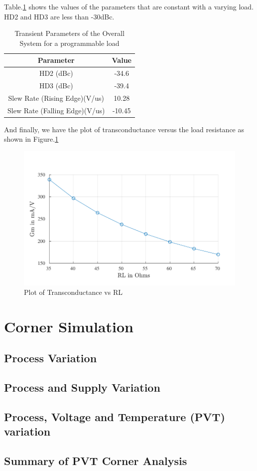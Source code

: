 Table.\ref{tab:RL_trans_2} shows the values of the parameters that are constant with a varying load. HD2 and HD3 are less than -30dBc.
\begin{table} [H]
\centering
\begin{tabular}{@{}cc@{}}
\toprule
Parameter							& Value		\\ \midrule
HD2 (dBc)							& -34.6 			\\
HD3 (dBc)							& -39.4 			\\
Slew Rate (Rising Edge)(V/us)		& 10.28 			\\
Slew Rate (Falling Edge)(V/us)		& -10.45 			\\
\bottomrule
\end{tabular}
\caption{Transient Parameters of the Overall System for a programmable load}
\label{tab:RL_trans_2}
\end{table}
And finally, we have the plot of transconductance versus the load resistance as shown in Figure.\ref{fig:RL_Gm}
\begin{figure} [H]
\centering
\includegraphics[scale=1]{Figures/Plots/Ov_Gm_RL.pdf}
\caption{Plot of Transconductance vs RL}
\label{fig:RL_Gm}
\end{figure}

\section{Corner Simulation}
\subsection{Process Variation}
\subsection{Process and Supply Variation}
\subsection{Process, Voltage and Temperature (PVT) variation}
\subsection{Summary of PVT Corner Analysis}